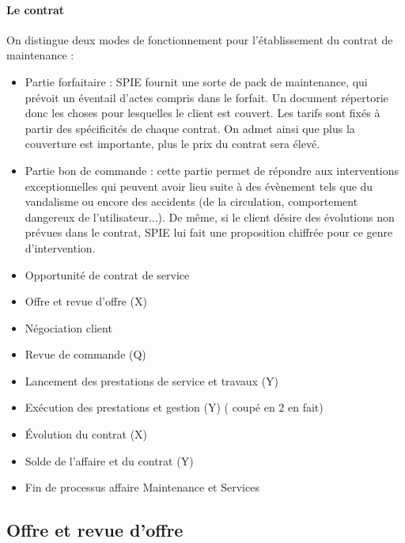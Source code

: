 \paragraph{Le contrat}

On distingue deux modes de fonctionnement pour l’établissement du contrat de maintenance :

\begin{itemize}
\item Partie forfaitaire : SPIE fournit une sorte de pack de maintenance, qui prévoit un éventail d’actes compris dans le forfait. Un document répertorie donc les choses pour lesquelles le client est couvert. Les tarifs sont fixés à partir des spécificités de chaque contrat. On admet ainsi que plus la couverture est importante, plus le prix du contrat sera élevé. 
\item Partie bon de commande : cette partie permet de répondre aux interventions exceptionnelles qui peuvent avoir lieu suite à des évènement tels que du vandalisme ou encore des accidents (de la circulation, comportement dangereux de l’utilisateur...). De même, si le client désire des évolutions non prévues dans le contrat, SPIE lui fait une proposition chiffrée pour ce genre d’intervention.
\end{itemize}


\begin{itemize}
\item Opportunité de contrat de service
\item Offre et revue d’offre (X)
\item Négociation client 
\item Revue de commande (Q)
\item Lancement des prestations de service et travaux (Y)
\item Exécution des prestations et gestion (Y) ( coupé en 2 en fait)
\item Évolution du contrat (X)
\item Solde de l’affaire et du contrat (Y)
\item Fin de processus affaire Maintenance et Services
\end{itemize}

\subsection{Offre et revue d’offre}

